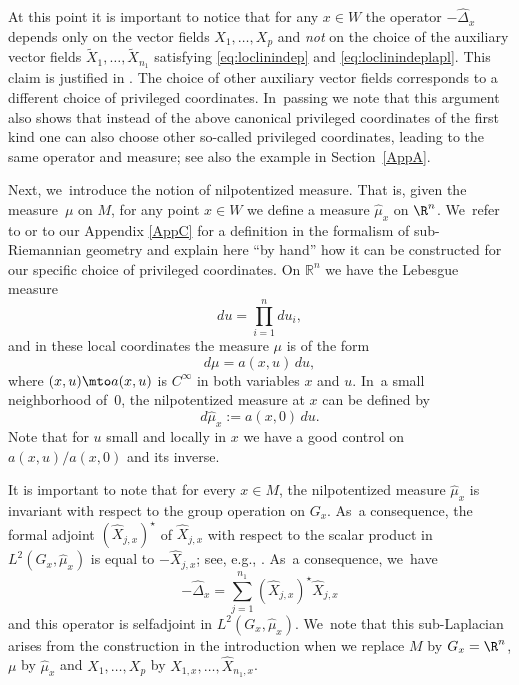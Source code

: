 At this point it is important to notice that for any $x\in W$ the operator $-\widehat\Delta_x$ depends only on the vector fields $X_1,\ldots,X_p$ and \emph{not} on the choice of the auxiliary vector fields $\tilde X_1,\ldots,\tilde X_{n_1}$ satisfying \eqref{eq:loclinindep} and \eqref{eq:loclinindeplapl}. This claim is justified in \hbox{\cite[\S A.5.4]{CHT1}}. The choice of other auxiliary vector fields corresponds to a different choice of privileged coordinates. In~passing we note that this argument also shows that instead of the above canonical privileged coordinates of the first kind one can also choose other so-called privileged coordinates, leading to the same operator and measure; see also the example in Section~\ref{AppA}.

Next, we~introduce the notion of nilpotentized measure. That is, given the measure~$\mu$ on $M$, for any point $x\in W$ we define a measure $\widehat \mu_x$ on $\R^n$. We~refer to \cite[App.\,A.5.6]{CHT1} or to our Appendix \ref{AppC} for a definition in the formalism of sub-Riemannian geometry and explain here ``by hand'' how it can be constructed for our specific choice of privileged coordinates.
On $\mathbb R^n$ we have the Lebesgue measure
\[
du= \prod_{i=1}^n du_{i},
\]
and in these local coordinates the measure $\mu$ is of the form
\[
d\mu = a(x,u) \,du,
\]
where $(x,u)\mto a(x,u)$ is $C^\infty$ in both variables $x$ and $u$. In~a small neighborhood of~$0$, the nilpotentized measure at $x$ can be defined by
\begin{equation}\label{eq:nilpmeas}
d\widehat \mu_x:= a(x,0) \,du.
\end{equation}
Note that for $u$ small and locally in $x$ we have a good control on $a(x,u)/a(x,0)$ and its inverse.

It is important to note that for every $x\in M$, the nilpotentized measure $\widehat\mu_x$ is invariant with respect to the group operation on $G_x$. As~a consequence, the formal adjoint $(\widehat X_{j,x})^\star$ of $\widehat X_{j,x}$ with respect to the scalar product in $L^2(G_x,\widehat\mu_x)$ is equal to $-\widehat X_{j,x}$; see, e.g., \cite[Rem.\,A.5]{CHT1}. As~a consequence, we~have
\[
-\widehat \Delta_x = \sum_{j=1}^{n_1} (\widehat X_{j,x})^\star \widehat X_{j,x}
\]
and this operator is selfadjoint in $L^2(G_x,\widehat\mu_x)$. We~note that this sub-Laplacian arises from the construction in the introduction when we replace $M$ by $G_x=\R^n$, $\mu$ by $\widehat\mu_x$ and $X_1,\ldots,X_p$ by $\widehat X_{1,x},\ldots,\widehat X_{n_1,x}$.

